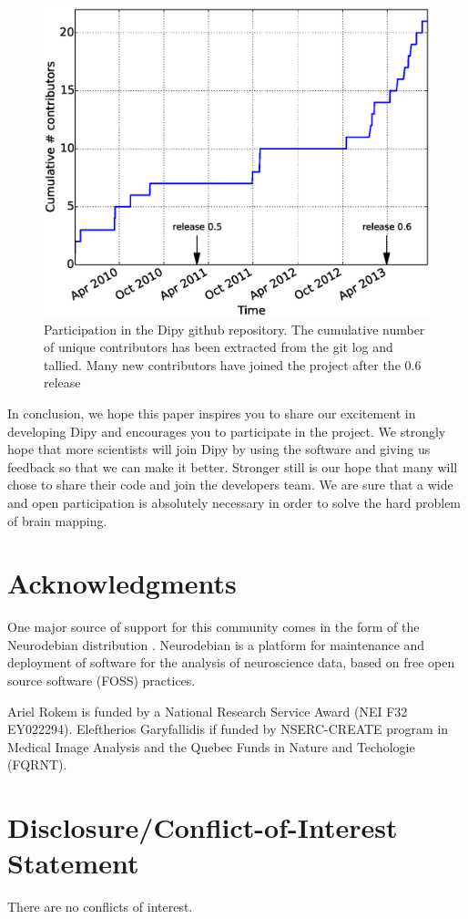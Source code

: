 \documentclass{bioinfo}
\begin{document}
\begin{figure}
\centering{}
\includegraphics[scale=0.37]{Figures/fig-gh.eps}
\caption{Participation in the Dipy github repository. The cumulative number of
  unique contributors has been extracted from the git log and tallied. Many
  new contributors have joined the project after the 0.6 release\label{Fig:gh_stats}}
\end{figure}

In conclusion, we hope this paper inspires you to share our excitement in developing Dipy and encourages 
you to participate in the project. We strongly hope that more scientists will join 
Dipy by using the software and giving us feedback so that we can make it better. Stronger still 
is our hope that many will chose to share their code and join the developers team. We are sure that 
a wide and open participation is absolutely necessary in order to solve the hard problem of brain mapping. 


\section*{Acknowledgments}
One major source of support for this community comes in the form of the Neurodebian
distribution \citep{Halchenko2012}. Neurodebian is a platform for maintenance
and deployment of software for the analysis of neuroscience data, based on free
open source software (FOSS) practices.

Ariel Rokem is funded by a National Research Service Award (NEI F32 EY022294).
Eleftherios Garyfallidis if funded by NSERC-CREATE program in Medical
Image Analysis and the Quebec Funds in Nature and Techologie (FQRNT).

\section*{Disclosure/Conflict-of-Interest Statement}
There are no conflicts of interest.



%

%
%
%
%

\end{document}
